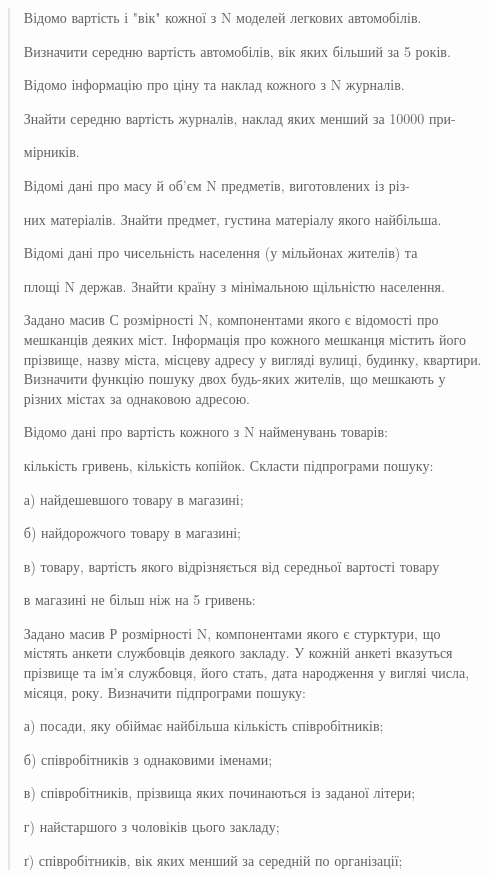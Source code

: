 \documentclass[]{article}
\begin{document}
\begin{quote}
Відомо вартість і "вік" кожної з N моделей легкових автомобілів.

Визначити середню вартість автомобілів, вік яких більший за 5 років.

Відомо інформацію про ціну та наклад кожного з N журналів.

Знайти середню вартість журналів, наклад яких менший за 10000 при-

мірників.

Відомі дані про масу й об'єм N предметів, виготовлених із різ-

них матеріалів. Знайти предмет, густина матеріалу якого найбільша.

Відомі дані про чисельність населення (у мільйонах жителів) та

площі N держав. Знайти країну з мінімальною щільністю населення.

Задано масив С розмірності N, компонентами якого є відомості про
мешканців деяких міст. Інформація про кожного мешканця містить його
прізвище, назву міста, місцеву адресу у вигляді вулиці, будинку,
квартири. Визначити функцію пошуку двох будь-яких жителів, що мешкають у
різних містах за однаковою адресою.

Відомо дані про вартість кожного з N найменувань товарів:

кількість гривень, кількість копійок. Скласти підпрограми пошуку:

а) найдешевшого товару в магазині;

б) найдорожчого товару в магазині;

в) товару, вартість якого відрізняється від середньої вартості товару

в магазині не більш ніж на 5 гривень:

Задано масив Р розмірності N, компонентами якого є стурктури, що містять
анкети службовців деякого закладу. У кожній анкеті вказуться прізвище та
ім'я службовця, його стать, дата народження у вигляі числа, місяця,
року. Визначити підпрограми пошуку:

а) посади, яку обіймає найбільша кількість співробітників;

б) співробітників з однаковими іменами;

в) співробітників, прізвища яких починаються із заданої літери;

г) найстаршого з чоловіків цього закладу;

ґ) співробітників, вік яких менший за середній по організації;


\end{quote}
\end{document}
